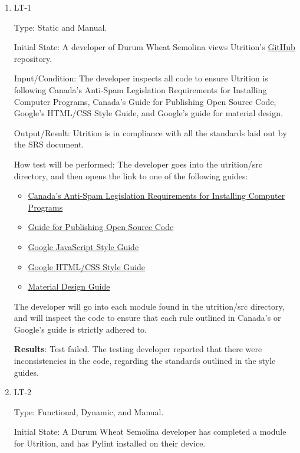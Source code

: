 \documentclass[12pt, titlepage]{article}
\begin{document}
	\begin{enumerate}
		\item{LT-1}
		
		Type: Static and Manual.
		
		Initial State: A developer of Durum Wheat Semolina views Utrition’s \href{https://github.com/jeff-rey-wang/utrition/}{GitHub} repository.
		
		Input/Condition: The developer inspects all code to ensure Utrition is following Canada’s Anti-Spam Legislation Requirements for Installing Computer Programs, Canada’s Guide for Publishing Open Source Code, Google’s HTML/CSS Style Guide, and Google’s guide for material design.
		
		Output/Result: Utrition is in compliance with all the standards laid out by the SRS document.
		
		How test will be performed: The developer goes into the utrition/src directory, and then opens the link to one of the following guides:
		\begin{itemize}
			\item \href{https://crtc.gc.ca/eng/internet/install.htm}{Canada’s Anti-Spam Legislation Requirements for Installing Computer Programs}
			\item \href{https://www.canada.ca/en/government/system/digital-government/digital-government-innovations/open-source-software/guide-for-publishing-open-source-code.html}{Guide for Publishing Open Source Code}
			\item \href{https://google.github.io/styleguide/jsguide.html}{Google JavaScript Style Guide}
			\item \href{https://google.github.io/styleguide/htmlcssguide.html}{Google HTML/CSS Style Guide}
			\item \href{https://material.io/design}{Material Design Guide}
		\end{itemize}
		The developer will go into each module found in the utrition/src directory, and will inspect the code to ensure that each rule outlined in Canada’s or Google’s guide is strictly adhered to.
		
		\textbf{Results}: Test failed. The testing developer reported that there were inconsistencies in the code, regarding the standards outlined in the style guides.
		
		\item{LT-2}
		
		Type: Functional, Dynamic, and Manual.
		
		Initial State: A Durum Wheat Semolina developer has completed a module for Utrition, and has Pylint installed on their device.
		

\end{enumerate}
\end{document}

